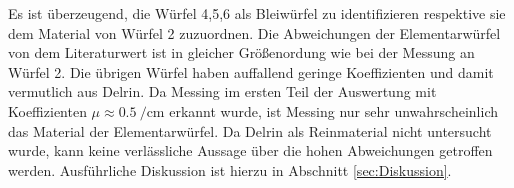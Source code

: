Es ist überzeugend, die Würfel 4,5,6 als Bleiwürfel zu identifizieren respektive sie
dem Material von Würfel 2 zuzuordnen.
Die Abweichungen der Elementarwürfel von dem Literaturwert ist in gleicher Größenordung
wie bei der Messung an Würfel 2.
Die übrigen Würfel haben auffallend geringe Koeffizienten und damit vermutlich aus Delrin.
Da Messing im ersten Teil der Auswertung mit Koeffizienten $\mu\approx\SI{0.5}{\per\centi\meter}$
erkannt wurde, ist Messing nur sehr unwahrscheinlich das Material der Elementarwürfel.
Da Delrin als Reinmaterial nicht untersucht wurde, kann keine verlässliche Aussage über die
hohen Abweichungen getroffen werden.
Ausführliche Diskussion ist hierzu in Abschnitt \ref{sec:Diskussion}.
